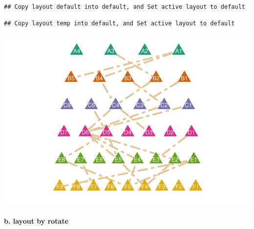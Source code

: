 \documentclass[
]{article}
\let\oldparagraph\paragraph
\renewcommand{\paragraph}[1]{\oldparagraph{#1}\mbox{}}
\begin{document}
\begin{verbatim}
## Copy layout default into default, and Set active layout to default
\end{verbatim}

\begin{verbatim}
## Copy layout temp into default, and Set active layout to default
\end{verbatim}

\includegraphics{ReadMe1_files/figure-latex/unnamed-chunk-11-1.pdf}

\hypertarget{b.-layout-by-rotate}{%
\paragraph{b. layout by rotate}\label{b.-layout-by-rotate}}
\end{document}
